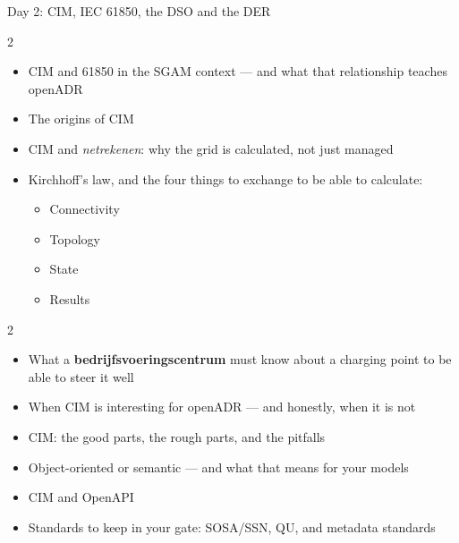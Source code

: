 \begin{frame}{Day 2: CIM, IEC 61850, the DSO and the DER}
  \small

  \begin{multicols}{2}
    \begin{itemize}
      \item CIM and 61850 in the SGAM context — and what that relationship teaches openADR
      \item The origins of CIM
      \item CIM and \emph{netrekenen}: why the grid is calculated, not just managed
      \item Kirchhoff's law, and the four things to exchange to be able to calculate:
      \begin{itemize}
        \item Connectivity
        \item Topology
        \item State
        \item Results
      \end{itemize}
    \end{itemize}
  \end{multicols}
  \vspace{0.2cm}
  \begin{multicols}{2}
    \begin{itemize}
      \item What a \textbf{bedrijfsvoeringscentrum} must know about a charging point to be able to steer it well
      \item When CIM is interesting for openADR — and honestly, when it is not
      \item CIM: the good parts, the rough parts, and the pitfalls
      \item Object-oriented or semantic — and what that means for your models
      \item CIM and OpenAPI
      \item Standards to keep in your gate: SOSA/SSN, QU, and metadata standards
    \end{itemize}
  \end{multicols}
\end{frame}
